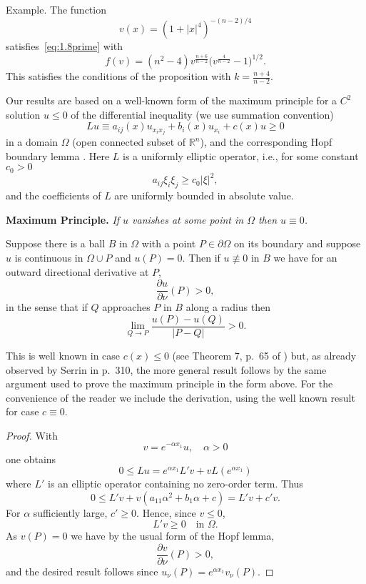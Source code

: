 Example. The function
\[v(x) = (1+|x|^4)^{-(n-2)/4}\]
satisfies~\eqref{eq:1.8prime} with
\[f(v) = (n^2-4) v^{\frac{n+6}{n-2}} \biggl(v^{\frac{4}{n-2}}-1\biggr)^{1/2}.\]
This satisfies the conditions of the proposition with $k = \frac{n+4}{n-2}$.

Our results are based on a well-known form of the maximum principle \cite{protter_maximum_1984} for
a $C^2$ solution $u\leq 0$ of the differential inequality (we use summation convention)
\begin{equation}\label{eq:1.10}
  Lu\equiv a_{ij}(x)u_{x_ix_j} + b_i(x)u_{x_i} + c(x)u \geq 0
\end{equation}
in a domain $\Omega$ (open connected subset of $\mathbb{R}^n$),
and the corresponding Hopf boundary lemma \cite{protter_maximum_1984}. 
Here $L$ is a uniformly elliptic operator, i.e., for some constant $c_0>0$
\begin{equation}\label{eq:1.11}
  a_{ij}\xi_i\xi_j \geq c_0|\xi|^2,
\end{equation}
and the coefficients of $L$ are uniformly bounded in absolute value.

\noindent \textbf{Maximum Principle.} \emph{If $u$ vanishes at some point in $\Omega$ then $u\equiv 0$.}

\begin{lemma}
  Suppose there is a ball $B$ in $\Omega$ with a point $P\in\partial\Omega$
  on its boundary and suppose $u$ is continuous in $\Omega\cup P$ and $u(P)=0$.
  Then if $u\not\equiv 0$ in $B$ we have for an outward directional derivative at $P$,
  \[\frac{\partial u}{\partial \nu}(P) > 0,\]
  in the sense that if $Q$ approaches $P$ in $B$ along a radius then
  \[\lim_{Q\to P} \frac{u(P)-u(Q)}{|P-Q|} > 0.\]
\end{lemma}

This is well known in case $c(x)\leq 0$ (see Theorem 7, p.~65 of \cite{protter_maximum_1984}) but,
as already observed by Serrin in \cite{serrin_symmetry_1971} p.~310, the more general result follows by the same
argument used to prove the maximum principle in the form above.
For the convenience of the reader we include the derivation, using the well known
result for case $c\equiv 0$.

\begin{proof}
  With
  \[v = e^{-\alpha x_1} u, \quad \alpha>0\]
  one obtains
  \[0\leq Lu = e^{\alpha x_1} L'v + vL(e^{\alpha x_1})\]
  where $L'$ is an elliptic operator containing no zero-order term. Thus
  \[0\leq L'v + v(a_{11}\alpha^2 + b_1\alpha +c) = L'v + c'v.\]
  For $\alpha$ sufficiently large, $c'\geq 0$. Hence, since $v\leq 0$,
  \[L'v \geq 0\quad \text{in } \Omega.\]
  As $v(P)=0$ we have by the usual form of the Hopf lemma,
  \[\frac{\partial v}{\partial \nu}(P)>0,\]
  and the desired result follows since $u_{\nu}(P) = e^{\alpha x_1} v_{\nu}(P)$.
\end{proof}

